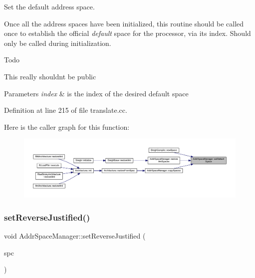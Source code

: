 Set the default address space. 

Once all the address spaces have been initialized, this routine should be called once to establish the official {\itshape default} space for the processor, via its index. Should only be called during initialization. \begin{DoxyRefDesc}{Todo}
\item[\mbox{\hyperlink{todo__todo000001}{Todo}}]This really shouldn\textquotesingle{}t be public \end{DoxyRefDesc}

\begin{DoxyParams}{Parameters}
{\em index} & is the index of the desired default space \\
\hline
\end{DoxyParams}


Definition at line 215 of file translate.\+cc.

Here is the caller graph for this function\+:
\nopagebreak
\begin{figure}[H]
\begin{center}
\leavevmode
\includegraphics[width=350pt]{class_addr_space_manager_aa2804a97aa4900bf84f0c2ff064847ec_icgraph}
\end{center}
\end{figure}
\mbox{\label{class_addr_space_manager_abdab85595c68e18ab86dd42af914f35b}} 
\subsubsection{\texorpdfstring{setReverseJustified()}{setReverseJustified()}}
{\footnotesize\ttfamily void Addr\+Space\+Manager\+::set\+Reverse\+Justified (\begin{DoxyParamCaption}\item[{\mbox{\hyperlink{class_addr_space}{Addr\+Space}} $\ast$}]{spc }\end{DoxyParamCaption})\hspace{0.3cm}{\ttfamily [protected]}}



